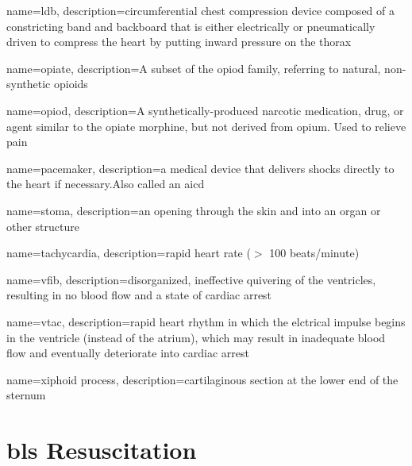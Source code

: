 \documentclass[../../EMT-169.tex]{subfiles}
\begin{document}
	{
		name=\acrfull{ldb},
		description={circumferential chest compression device composed of a constricting band and backboard that is either electrically or pneumatically driven to compress the heart by putting inward pressure on the thorax}
	}

	{
		name=opiate,
		description={A subset of the opiod family, referring to natural, non-synthetic opioids}
	}

	{
		name=opiod,
		description={A synthetically-produced narcotic medication, drug, or agent similar to the opiate morphine, but not derived from opium.  Used to relieve pain}
	}

	{
		name=pacemaker,
		description={a medical device that delivers shocks directly to the heart if necessary.\newline Also called an \acrfull{aicd}}
	}

	{
		name=stoma,
		description={an opening through the skin and into an organ or other structure}
	}

	{
		name=tachycardia,
		description={rapid heart rate ($>$ 100 beats/minute)}
	}

	{
		name=\acrfull{vfib},
		description={disorganized, ineffective quivering of the ventricles, resulting in no blood flow and a state of cardiac arrest}
	}

	{
		name=\acrfull{vtac},
		description={rapid heart rhythm in which the elctrical impulse begins in the ventricle (instead of the atrium), which may result in inadequate blood flow and eventually deteriorate into cardiac arrest}
	}

	{
		name=xiphoid process,
		description={cartilaginous section at the lower end of the sternum}
	}

\chapter{\acrshort{bls} Resuscitation}
\end{document}
